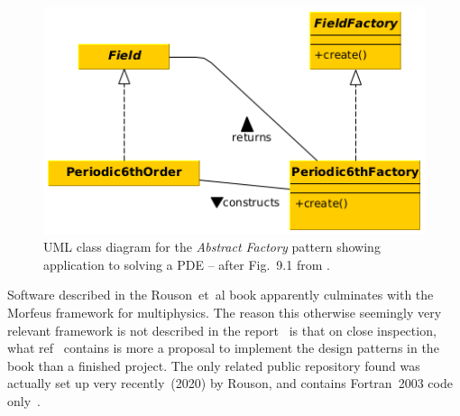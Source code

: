 \begin{figure}
\centerline{\includegraphics[width=12cm]{../png/factory_wa}}
\caption{UML class diagram for the {\it Abstract Factory} pattern showing application to solving a PDE -- after Fig.~9.1 from .\label{fig:factory}}
\end{figure}


Software described in the Rouson~et~al book apparently culminates with the Morfeus framework for 
multiphysics. The reason this otherwise seemingly very relevant framework is not described in the report~\cite{y2re312}
is that on close inspection, what ref~\cite{rousonxiaxu} contains is more a proposal to implement the design
patterns in the book than a finished project. The only related public repository found was actually set up very recently~(2020)
by Rouson, and contains Fortran~2003 code only~\cite{morfeuswebsite}.

%
